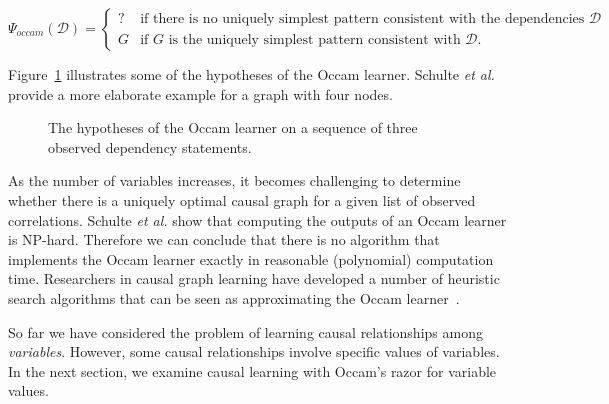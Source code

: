 \documentclass{elsarticle}%
\newcommand{\learnera}{\Psi}
\newcommand{\occam}{\learnera_{\mathit{occam}}}
\newcommand{\G}{G}
\newcommand{\D}{\mathcal{D}}
\begin{document}
$$
\occam(\D)=
\begin{cases}
? & \text{if there is no uniquely simplest pattern consistent with the dependencies }\D\\
\G & \text{if $\G$ is the uniquely simplest pattern consistent with  }\D.
\end{cases}
$$

Figure~\ref{fig:occam-learn} illustrates some of the hypotheses of the Occam learner. Schulte {\em et al.}~\cite{Schulte2010} provide a more elaborate example for a graph with four nodes. 

\begin{figure}[htbp]
\centering
{}
\caption{The hypotheses of the Occam learner on a sequence of three observed dependency statements.}%
\label{fig:occam-learn}%
\end{figure}

As the number of variables increases, it becomes challenging to determine whether there is a  uniquely optimal causal graph for a given list of observed correlations. Schulte {\em et al.} \cite[Th.23]{Schulte2010} show that computing the outputs of an Occam learner is NP-hard. Therefore we can conclude that there is no algorithm that implements the Occam learner exactly in reasonable (polynomial) computation time. Researchers in causal graph learning have developed a number of heuristic search algorithms that can be seen as approximating the Occam learner~\cite{Schulte2010a}.

So far we have considered the problem of learning causal relationships among {\em variables}. However, some causal relationships involve specific values of variables. In the next section, we examine causal learning with Occam's razor for variable values. 
\end{document}
